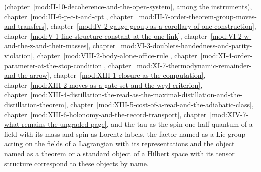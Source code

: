 \begin{chbridge}
(chapter~\ref{mod:II-10-decoherence-and-the-open-system}, among the instruments), chapter~\ref{mod:III-6-p-c-t-and-cpt}, chapter~\ref{mod:III-7-order-theorem-group-moves-and-transfers}, chapter~\ref{mod:IV-2-gauge-group-as-a-corollary-of-one-construction}, chapter~\ref{mod:V-1-fine-structure-constant-at-the-one-link}, chapter~\ref{mod:VI-2-w-and-the-z-and-their-masses}, chapter~\ref{mod:VI-3-doublets-handedness-and-parity-violation}, chapter~\ref{mod:VIII-2-body-alone-office-rule}, chapter~\ref{mod:XI-4-order-parameter-at-the-stop-condition}, chapter~\ref{mod:XI-7-thermodynamic-remainder-and-the-arrow}, chapter~\ref{mod:XIII-1-closure-as-the-computation}, chapter~\ref{mod:XIII-2-moves-as-a-gate-set-and-the-weyl-criterion}, chapter~\ref{mod:XIII-4-distillation-the-read-as-the-maximal-distillation-and-the-distillation-theorem}, chapter~\ref{mod:XIII-5-cost-of-a-read-and-the-adiabatic-class}, chapter~\ref{mod:XIII-6-holonomy-and-the-record-transport}, chapter~\ref{mod:XIV-7-what-remains-the-ungraded-page}, and the tau as the spin-one-half quantum of a field with its mass and spin as Lorentz labels, the factor named as a Lie group acting on the fields of a Lagrangian with its representations and the object named as a theorem or a standard object of a Hilbert space with its tensor structure correspond to these objects by name.
\end{chbridge}
